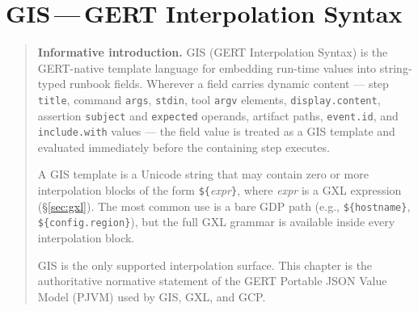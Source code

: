 %
%

\providecommand{\TODO}[1]{\textbf{\textcolor{red}{[TODO:~#1]}}}

\chapter{GIS\,---\,GERT Interpolation Syntax}
\label{sec:gis}

\begin{quote}
\noindent\textbf{Informative introduction.}
GIS (GERT Interpolation Syntax) is the GERT-native template language for
embedding run-time values into string-typed runbook fields.
Wherever a field carries dynamic content — step \texttt{title},
command \texttt{args}, \texttt{stdin}, tool \texttt{argv} elements,
\texttt{display.content}, assertion \texttt{subject} and \texttt{expected}
operands, artifact paths, \texttt{event.id}, and \texttt{include.with}
values — the field value is treated as a GIS template and evaluated
immediately before the containing step executes.

A GIS template is a Unicode string that may contain zero or more
interpolation blocks of the form \texttt{\$\{}\textit{expr}\texttt{\}},
where \textit{expr} is a GXL expression (\S\ref{sec:gxl}).
The most common use is a bare GDP path
(e.g., \texttt{\$\{hostname\}}, \texttt{\$\{config.region\}}),
but the full GXL grammar is available inside every interpolation block.

GIS is the only supported interpolation surface.
This chapter is the authoritative normative statement of the
GERT Portable JSON Value Model (PJVM) used by GIS, GXL, and GCP.
\end{quote}

